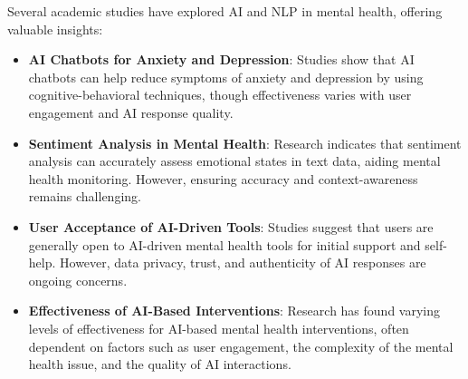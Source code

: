 Several academic studies have explored AI and NLP in mental health, offering valuable insights:

\begin{itemize}
    \item \textbf{AI Chatbots for Anxiety and Depression}: Studies show that AI chatbots can help reduce symptoms of anxiety and depression by using cognitive-behavioral techniques, though effectiveness varies with user engagement and AI response quality.
    \item \textbf{Sentiment Analysis in Mental Health}: Research indicates that sentiment analysis can accurately assess emotional states in text data, aiding mental health monitoring. However, ensuring accuracy and context-awareness remains challenging.
    \item \textbf{User Acceptance of AI-Driven Tools}: Studies suggest that users are generally open to AI-driven mental health tools for initial support and self-help. However, data privacy, trust, and authenticity of AI responses are ongoing concerns.
    \item \textbf{Effectiveness of AI-Based Interventions}: Research has found varying levels of effectiveness for AI-based mental health interventions, often dependent on factors such as user engagement, the complexity of the mental health issue, and the quality of AI interactions.
\end{itemize}
